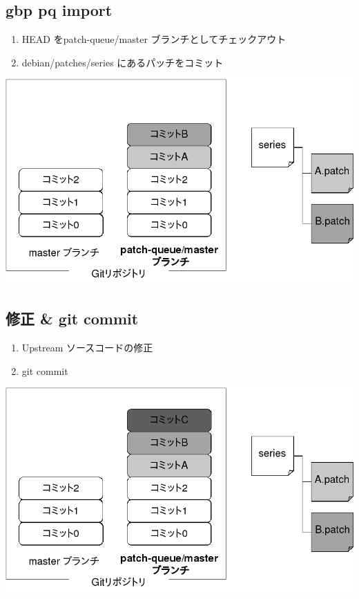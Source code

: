 \documentclass[mingoth,a4paper]{jsarticle}
\begin{document}
\subsection{gbp pq import}

  \begin{enumerate}
   \item HEAD をpatch-queue/master ブランチとしてチェックアウト
   \item debian/patches/series にあるパッチをコミット
  \end{enumerate}

\begin{center}
\includegraphics[width=0.8\hsize]{image201509/gbp-pq1_mono.png}
\end{center}


\subsection{修正 \& git commit}

  \begin{enumerate}
   \item Upstream ソースコードの修正
   \item git commit
  \end{enumerate}

\begin{center}
\includegraphics[width=0.8\hsize]{image201509/gbp-pq2_mono.png}
\end{center}
\end{document}
